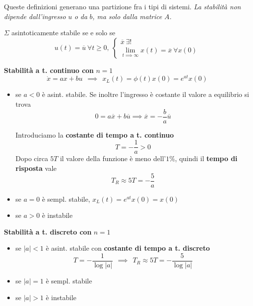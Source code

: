 Queste definizioni generano una partizione fra i tipi di sistemi. \textit{La stabilità non dipende dall'ingresso }$u$\textit{ o da }$b$\textit{, ma solo dalla matrice }$A$\textit{.}
\begin{thm}
	$\Sigma $ asintoticamente stabile se e solo se
	\begin{equation*}
		u\left(t\right) =\overline{u} \ \forall t\geq 0,\ \begin{cases}
		\overline{x} \ \exists !\\
		\lim _{t\implies \infty } x\left(t\right) =\overline{x} \ \forall x\left(0\right)
		\end{cases}
	\end{equation*}
\end{thm}
\textbf{Stabilità a t. continuo con }$n=1$\textbf{ }
\begin{equation*}
	\dot{x} =ax+bu\ \ \implies \ \ x_L\left(t\right) =\phi \left(t\right) x\left(0\right) =e^{at} x\left(0\right)
\end{equation*}
\begin{itemize}
	\item se $a< 0$ è asint. stabile. Se inoltre l'ingresso è costante il valore a equilibrio si trova\begin{equation*}
	      0=a\overline{x} +b\overline{u} \implies \overline{x} =-\frac{b}{a}\overline{u}
	\end{equation*}
	
	Introduciamo la \textbf{costante di tempo a t. continuo}\begin{equation*}
	\boxed{T=-\frac{1}{a}  >0}
	\end{equation*}Dopo circa $5T$ il valore della funzione è meno dell'$1\%$, quindi il \textbf{tempo di risposta} vale\begin{equation*}
	\boxed{T_R \approx 5T=-\frac{5}{a}}
	\end{equation*}
	\item se $a=0$ è sempl. stabile, $x_L\left(t\right) =e^{at} x\left(0\right) =x\left(0\right)$
	\item se $a >0$ è instabile
\end{itemize}

\textbf{Stabilità a t. discreto con} $n=1$
\begin{itemize}
	\item se $\left| a\right| < 1$ è asint. stabile con \textbf{costante di tempo a t. discreto}\begin{equation*}
	      \boxed{T=-\frac{1}{\log\left| a\right| }} \ \ \implies \ \ \boxed{T_R \approx 5T=-\frac{5}{\log\left| a\right| }}
	\end{equation*}
	\item se $\left| a\right| =1$ è sempl. stabile
	\item se $\left| a\right|  >1$ è instabile
\end{itemize}


